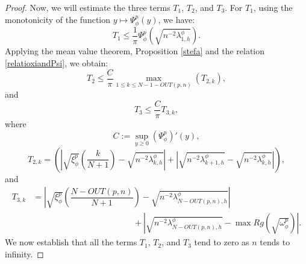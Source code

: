 \documentclass[11pt]{article}
\begin{document}
\begin{proof}
Now, we will estimate the three terms $T_1$, $T_2$, and $T_3$. For $T_1$, using the monotonicity of the function $y \mapsto \Psi^p_{\phi}(y)$, we have:
\begin{equation}\label{eq:gedis-2}
T_1\leq \frac{1}{\pi}\Psi^p_{\phi} \left( \sqrt{n^{-2}\lambda_{1,h}^{\phi}} \right).
\end{equation}
Applying the mean value theorem, Proposition \ref{stefa} and the relation \eqref{relatioxiandPsi}, we obtain:
\begin{equation}\label{eq:gedis-3}
T_2\leq \frac{C}{\pi} \max_{1\leq k\leq  N-1-OUT(p,n)}\left(T_{2,k}\right),
\end{equation}
and
\begin{equation}\label{eq:gedis-4}
T_3\leq  \frac{C}{\pi} T_{3,k},
\end{equation}
where $$C:=\sup_{y\geq 0}\left(\Psi^p_{\phi}\right)'(y),$$
$$T_{2,k}=\left(\left|\sqrt{\xi_{\phi}^p}\left(\dfrac{k}{N+1}\right)- \sqrt{n^{-2}\lambda_{k,h}^{\phi}}   \right|+ \left|  \sqrt{ n^{-2}\lambda_{k+1,h}^{\phi}}-\sqrt{n^{-2}\lambda_{k,h}^{\phi}}\right|\right),$$
and 
\begin{equation*}
    \begin{split}
      T_{3,k}&=\left|\sqrt{\xi_{\phi}^p}\left(\dfrac{N-OUT(p,n)}{N+1}\right)- \sqrt{n^{-2}\lambda_{N-OUT(p,n),h}^{\phi}}   \right|\\&\hspace{5cm}+ \left|  \sqrt{ n^{-2}\lambda_{N-OUT(p,n),h}^{\phi}}-\max Rg\left(\sqrt{\omega_\phi^p}\right)\right|.  
    \end{split}
\end{equation*}
We now establish that all the terms $T_1$, $T_2$, and $T_3$ tend to zero as $n$ tends to infinity.


\end{proof}
\end{document}
